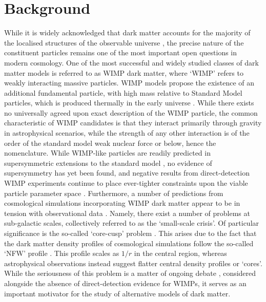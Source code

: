 \section{Background}

While it is widely acknowledged that dark matter accounts for the majority of the localised structures of the observable universe \cite{Ade:2015xua}, the precise nature of the constituent particles remains one of the most important open questions in modern cosmology. One of the most successful and widely studied classes of dark matter models is referred to as WIMP dark matter, where `WIMP' refers to weakly interacting massive particles. WIMP models propose the existence of an additional fundamental particle, with high mass relative to Standard Model particles, which is produced thermally in the early universe \cite{Roszkowski:2017nbc}. While there exists no universally agreed upon exact description of the WIMP particle, the common characteristic of WIMP candidates is that they interact primarily through gravity in astrophysical scenarios, while the strength of any other interaction is of the order of the standard model weak nuclear force or below, hence the nomenclature. While WIMP-like particles are readily predicted in supersymmetric extensions to the  standard model \cite{Chang:2013oia}, no evidence of supersymmetry has yet been found, and negative results from direct-detection WIMP experiments continue to place ever-tighter constraints upon the viable particle parameter space \cite{Cui:2017nnn}. Furthermore, a number of predictions from cosmological simulations incorporating WIMP dark matter appear to be in tension with observational data \cite{Bullock:2017xww}. Namely, there exist a number of problems at sub-galactic scales, collectively referred to as the `small-scale crisis'. Of particular significance is the so-called `core-cusp' problem \cite{Moore:1994yx}. This arises due to the fact that the dark matter density profiles of cosmological simulations follow the so-called `NFW' profile \cite{Navarro:1995iw}. This profile scales as $1/r$ in the central region, whereas astrophysical observations instead suggest flatter central density profiles or `cores'. While the seriousness of this problem is a matter of ongoing debate \cite{anna2018}, considered alongside the absence of direct-detection evidence for WIMPs, it serves as an important motivator for the study of alternative models of dark matter.  

